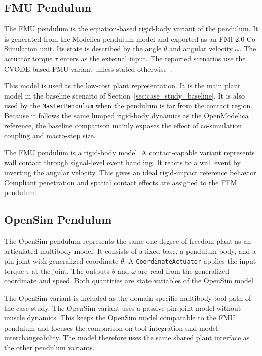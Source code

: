 \subsection{FMU Pendulum}
\label{sec:case_study_pendulum_fmu}

The \ac{FMU} pendulum is the equation-based rigid-body variant of the pendulum.
It is generated from the Modelica pendulum model and exported as an \ac{FMI} 2.0 Co-Simulation unit.
Its state is described by the angle \(\theta\) and angular velocity \(\omega\).
The actuator torque \(\tau\) enters as the external input.
The reported scenarios use the \ac{CVODE}-based \ac{FMU} variant unless stated otherwise~\cite{openmodelica_users_guide_2026}.

This model is used as the low-cost plant representation.
It is the main plant model in the baseline scenario of Section~\ref{sec:case_study_baseline}.
It is also used by the \texttt{MasterPendulum} when the pendulum is far from the contact region.
Because it follows the same lumped rigid-body dynamics as the OpenModelica reference, the baseline comparison mainly exposes the effect of co-simulation coupling and macro-step size.

The \ac{FMU} pendulum is a rigid-body model.
A contact-capable variant represents wall contact through signal-level event handling.
It reacts to a wall event by inverting the angular velocity.
This gives an ideal rigid-impact reference behavior.
Compliant penetration and spatial contact effects are assigned to the \ac{FEM} pendulum.

\subsection{OpenSim Pendulum}
\label{sec:case_study_pendulum_opensim}

The OpenSim pendulum represents the same one-degree-of-freedom plant as an articulated multibody model.
It consists of a fixed base, a pendulum body, and a pin joint with generalized coordinate \(\theta\).
A \texttt{CoordinateActuator} applies the input torque \(\tau\) at the joint.
The outputs \(\theta\) and \(\omega\) are read from the generalized coordinate and speed.
Both quantities are state variables of the OpenSim model.

The OpenSim variant is included as the domain-specific multibody tool path of the case study.
The OpenSim variant uses a passive pin-joint model without muscle dynamics.
This keeps the OpenSim model comparable to the \ac{FMU} pendulum and focuses the comparison on tool integration and model interchangeability.
The model therefore uses the same shared plant interface as the other pendulum variants.

